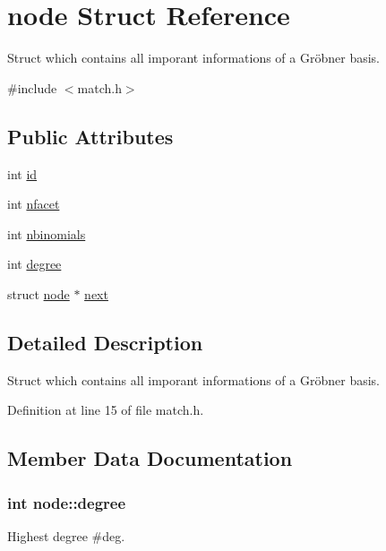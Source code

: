 \hypertarget{structnode}{\section{node Struct Reference}
\label{structnode}
}


Struct which contains all imporant informations of a Gröbner basis.  




{\ttfamily \#include $<$match.\-h$>$}

\subsection*{Public Attributes}
\begin{DoxyCompactItemize}
\item 
int \hyperlink{structnode_a8ceaa10e39f74fdfdae30c68a50074e2}{id}
\item 
int \hyperlink{structnode_a43553d464bfa1156bda24f6fc5624fe6}{nfacet}
\item 
int \hyperlink{structnode_a19e49943849e91bd93d40fe42e64a1aa}{nbinomials}
\item 
int \hyperlink{structnode_a5ef19e24e48768739e8743eccbc81434}{degree}
\item 
struct \hyperlink{structnode}{node} $\ast$ \hyperlink{structnode_aa3e8aa83f864292b5a01210f4453fcc0}{next}
\end{DoxyCompactItemize}


\subsection{Detailed Description}
Struct which contains all imporant informations of a Gröbner basis. 

Definition at line 15 of file match.\-h.



\subsection{Member Data Documentation}
\hypertarget{structnode_a5ef19e24e48768739e8743eccbc81434}{
\subsubsection[{degree}]{\setlength{\rightskip}{0pt plus 5cm}int node\-::degree}}\label{structnode_a5ef19e24e48768739e8743eccbc81434}
Highest degree \#deg. 

